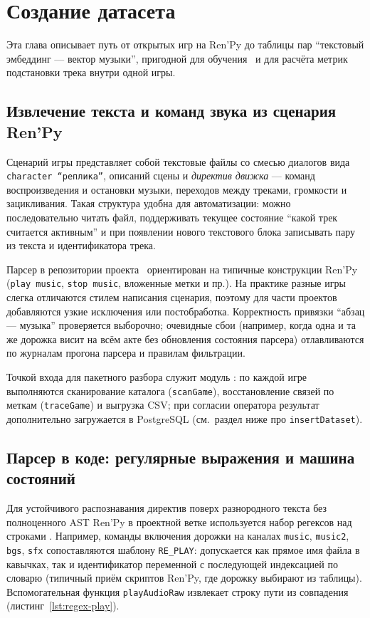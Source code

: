 \chapter{Создание датасета}
\label{ch:dataset}

Эта глава описывает путь от открытых игр на Ren'Py до таблицы пар ``текстовый эмбеддинг --- вектор музыки'', пригодной для обучения~\cite{nikolenko2018} и для расчёта метрик подстановки трека внутри одной игры.

\section{Извлечение текста и команд звука из сценария Ren'Py}

Сценарий игры представляет собой текстовые файлы со смесью диалогов вида \texttt{character ``реплика''}, описаний сцены и \textit{директив движка} --- команд воспроизведения и остановки музыки, переходов между треками, громкости и зацикливания. Такая структура удобна для автоматизации: можно последовательно читать файл, поддерживать текущее состояние ``какой трек считается активным'' и при появлении нового текстового блока записывать пару из текста и идентификатора трека.

Парсер в репозитории проекта~ ориентирован на типичные конструкции Ren'Py~\cite{srcrenpydocs} (\texttt{play music}, \texttt{stop music}, вложенные метки и пр.). На практике разные игры слегка отличаются стилем написания сценария, поэтому для части проектов добавляются узкие исключения или постобработка. Корректность привязки ``абзац --- музыка'' проверяется выборочно; очевидные сбои (например, когда одна и та же дорожка висит на всём акте без обновления состояния парсера) отлавливаются по журналам прогона парсера и правилам фильтрации.

Точкой входа для пакетного разбора служит модуль : по каждой игре выполняются сканирование каталога (\texttt{scanGame}), восстановление связей по меткам (\texttt{traceGame}) и выгрузка CSV; при согласии оператора результат дополнительно загружается в PostgreSQL (см.\ раздел ниже про \texttt{insertDataset}).

\section{Парсер в коде: регулярные выражения и машина состояний}

Для устойчивого распознавания директив поверх разнородного текста без полноценного AST Ren'Py в проектной ветке используется набор регексов над строками . Например, команды включения дорожки на каналах \texttt{music}, \texttt{music2}, \texttt{bgs}, \texttt{sfx} сопоставляются шаблону \texttt{RE\_PLAY}: допускается как прямое имя файла в кавычках, так и идентификатор переменной с последующей индексацией по словарю (типичный приём скриптов Ren'Py, где дорожку выбирают из таблицы). Вспомогательная функция \texttt{playAudioRaw} извлекает строку пути из совпадения (листинг~\ref{lst:regex-play}).

